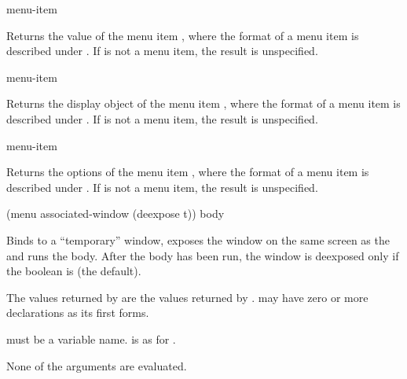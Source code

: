  {menu-item}

Returns the value of the menu item , where the format of a menu
item is described under .  If  is not a menu item,
the result is unspecified.

 {menu-item}

Returns the display object of the menu item , where the format of
a menu item is described under .  If  is not a
menu item, the result is unspecified.

 {menu-item}

Returns the options of the menu item , where the format of a menu
item is described under .  If  is not a menu
item, the result is unspecified.


 {(menu \optional associated-window \key (deexpose t))
                       \body body} 

Binds  to a ``temporary'' window, exposes the window on the same
screen as the  and runs the body.  After the body has
been run, the window is deexposed only if the boolean  is
 (the default).

The values returned by  are the values returned by .
 may have zero or more declarations as its first forms.

 must be a variable name.   is as for
.

None of the arguments are evaluated.
